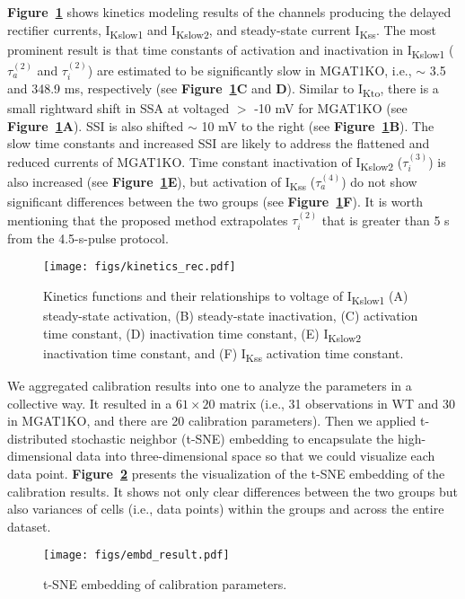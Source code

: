 \documentclass[11pt]{article}
\begin{document}
\textbf{Figure~\ref{fig:kinetics_rec}} shows kinetics modeling results of the channels producing the delayed rectifier currents, I\textsubscript{Kslow1} and I\textsubscript{Kslow2}, and steady-state current I\textsubscript{Kss}. The most prominent result is that time constants of activation and inactivation in I\textsubscript{Kslow1} ($\tau_{a}^{(2)}$ and $\tau_{i}^{(2)}$) are estimated to be significantly slow in MGAT1KO, i.e., $\sim$ 3.5 and 348.9 ms, respectively (see \textbf{Figure~\ref{fig:kinetics_rec}C} and \textbf{D}). Similar to I\textsubscript{Kto}, there is a small rightward shift in SSA at voltaged $>$ -10 mV for MGAT1KO (see \textbf{Figure~\ref{fig:kinetics_rec}A}). SSI is also shifted $\sim$ 10 mV to the right (see \textbf{Figure~\ref{fig:kinetics_rec}B}). The slow time constants and increased SSI are likely to address the flattened and reduced currents of MGAT1KO. Time constant inactivation of I\textsubscript{Kslow2} ($\tau_{i}^{(3)}$) is also increased (see \textbf{Figure~\ref{fig:kinetics_rec}E}), but activation of I\textsubscript{Kss} ($\tau_{a}^{(4)}$) do not show significant differences between the two groups (see \textbf{Figure~\ref{fig:kinetics_rec}F}). It is worth mentioning that the proposed method extrapolates $\tau_{i}^{(2)}$ that is greater than 5 s from the 4.5-s-pulse protocol.
\begin{figure}[!ht]
    \centering
    \texttt{[image: figs/kinetics\_rec.pdf]}
    \caption{Kinetics functions and their relationships to voltage of I\textsubscript{Kslow1} (A) steady-state activation, (B) steady-state inactivation, (C) activation time constant, (D) inactivation time constant, (E) I\textsubscript{Kslow2} inactivation time constant, and (F) I\textsubscript{Kss} activation time constant.}
    \label{fig:kinetics_rec}
\end{figure}

We aggregated calibration results into one to analyze the parameters in a collective way. It resulted in a $61\times20$ matrix (i.e., 31 observations in WT and 30 in MGAT1KO, and there are 20 calibration parameters). Then we applied t-distributed stochastic neighbor (t-SNE) embedding to encapsulate the high-dimensional data into three-dimensional space so that we could visualize each data point. \textbf{Figure~\ref{fig:embd_result}} presents the visualization of the t-SNE embedding of the calibration results. It shows not only clear differences between the two groups but also variances of cells (i.e., data points) within the groups and across the entire dataset.
\begin{figure}[!ht]
    \centering
    \texttt{[image: figs/embd\_result.pdf]}
    \caption{t-SNE embedding of calibration parameters.}
    \label{fig:embd_result}
\end{figure}
\end{document}
